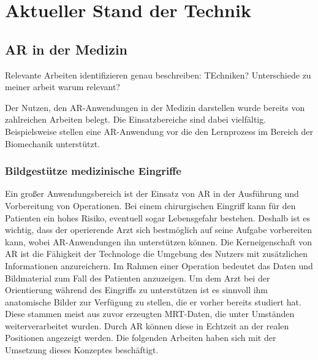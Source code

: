 
\chapter{Aktueller Stand der Technik}
\label{grundlagen}
\section{AR in der Medizin}												 %
 Relevante Arbeiten identifizieren
 genau beschreiben: TEchniken? Unterschiede zu meiner arbeit warum relevant?
 
Der Nutzen, den AR-Anwendungen in der Medizin darstellen wurde bereits von zahlreichen Arbeiten belegt. Die Einsatzbereiche sind dabei vielfältig.
Beispielsweise stellen \citet{Voinea16} eine AR-Anwendung vor die den Lernprozess im Bereich der Biomechanik unterstützt.

\subsection{Bildgestütze medizinische Eingriffe}

Ein großer Anwendungsbereich ist der Einsatz von AR in der Ausführung und Vorbereitung von Operationen. Bei einem chirurgischen Eingriff kann für den Patienten ein hohes Risiko, eventuell sogar Lebensgefahr bestehen. Deshalb ist es wichtig, dass der operierende Arzt sich bestmöglich auf seine Aufgabe vorbereiten kann, wobei AR-Anwendungen ihn unterstützen können.
Die Kerneigenschaft von AR ist die Fähigkeit der Technologe die Umgebung des Nutzers mit zusätzlichen Informationen anzureichern. Im Rahmen einer Operation bedeutet das Daten und Bildmaterial zum Fall des Patienten anzuzeigen. Um dem Arzt bei der Orientierung während des Eingriffs zu unterstützen ist es sinnvoll ihm anatomische Bilder zur Verfügung zu stellen, die er vorher bereits studiert hat. Diese stammen meist aus zuvor erzeugten MRT-Daten, die unter Umständen weiterverarbeitet wurden. Durch AR können diese in Echtzeit an der realen Positionen angezeigt werden. 
Die folgenden Arbeiten haben sich mit der Umsetzung dieses Konzeptes beschäftigt.


